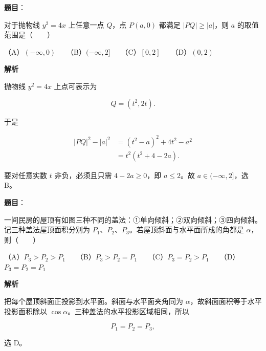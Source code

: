 \begin{answer}

\textbf{题目}：

对于抛物线 $y^2=4x$ 上任意一点 $Q$，点 $P(a,0)$ 都满足 $|PQ|\ge|a|$，则 $a$ 的取值范围是\mbox{（　　）}

（A）$(-\infty,0)$　　（B）$(-\infty,2]$　　（C）$[0,2]$　　（D）$(0,2)$

\textbf{解析}

抛物线 $y^2=4x$ 上点可表示为

\nopagebreak[4]
\[
Q=(t^2,2t).
\]

于是

\nopagebreak[4]
\[
\begin{aligned}
|PQ|^2-|a|^2
&=(t^2-a)^2+4t^2-a^2\\
&=t^2(t^2+4-2a).
\end{aligned}
\]

要对任意实数 $t$ 非负，必须且只需 $4-2a\ge0$，即 $a\le2$。故 $a\in(-\infty,2]$，选 B。


\end{answer}
\begin{answer}

\textbf{题目}：

一间民房的屋顶有如图三种不同的盖法：①单向倾斜；②双向倾斜；③四向倾斜。记三种盖法屋顶面积分别为 $P_1$、$P_2$、$P_3$。若屋顶斜面与水平面所成的角都是 $\alpha$，则\mbox{（　　）}
\nopagebreak[4]
\begin{center}\end{center}
\nopagebreak[4]
（A）$P_3>P_2>P_1$　　（B）$P_3>P_2=P_1$　　（C）$P_3=P_2>P_1$　　（D）$P_3=P_2=P_1$

\textbf{解析}

把每个屋顶斜面正投影到水平面。斜面与水平面夹角同为 $\alpha$，故斜面面积等于水平投影面积除以 $\cos\alpha$。三种盖法的水平投影区域相同，所以

\nopagebreak[4]
\[
P_1=P_2=P_3,
\]

选 D。


\end{answer}
